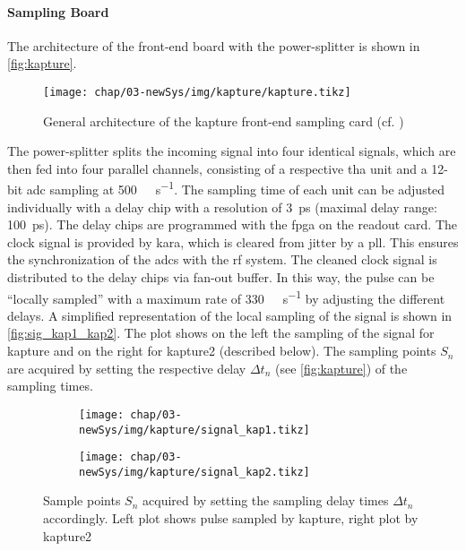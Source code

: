 \paragraph{Sampling Board}
The architecture of the front-end board with the power-splitter is shown in \autoref{fig:kapture}. 
\begin{figure}[H]
	\centering
	\texttt{[image: chap/03-newSys/img/kapture/kapture.tikz]}
	\caption[General architecture of the KAPTURE system]{General architecture of the \Gls{kapture} front-end sampling card (cf. \cite[p.2]{caselleKAP})}
	\label{fig:kapture}
\end{figure}
The power-splitter splits the incoming signal into four identical signals, which are then fed into four parallel channels, consisting of a respective \gls{tha} unit and a 12-bit \gls{adc} sampling at \SI{500}{\mega\sample\per\second}. 
The sampling time of each unit can be adjusted individually with a delay chip with a resolution of \SI{3}{\pico \second} (maximal delay range: \SI{100}{\pico \second}). 
The delay chips are programmed with the \gls{fpga} on the readout card.
The clock signal is provided by \gls{kara}, which is cleared from jitter by a \gls{pll}. 
This ensures the synchronization of the \glspl{adc} with the \gls{rf} system. 
The cleaned clock signal is distributed to the delay chips via fan-out buffer. \cite{caselleKAP}
In this way, the pulse can be ``locally sampled'' with a maximum rate of \SI{330}{\giga\sample\per\second} by adjusting the different delays. \newline
A simplified representation of the local sampling of the signal is shown in \autoref{fig:sig_kap1_kap2}.
The plot shows on the left the sampling of the signal for \gls{kapture} and on the right for \gls{kapture2} (described below).
The sampling points $S_n$ are acquired by setting the respective delay $\Delta t_n$ (see \autoref{fig:kapture}) of the sampling times. 
\begin{figure}[tb]
	\centering
	\begin{subfigure}{0.48\textwidth}
		\centering
		\texttt{[image: chap/03-newSys/img/kapture/signal\_kap1.tikz]}  
		\label{fig:sig_kap1}
	\end{subfigure}
	\hfill
	\begin{subfigure}{0.48\textwidth}
		\centering
		\texttt{[image: chap/03-newSys/img/kapture/signal\_kap2.tikz]}  
		\label{fig:sig_kap2}
	\end{subfigure}
	\caption[KAPTURE Pulse Sampling]{Sample points $S_n$ acquired by setting the sampling delay times $\Delta t_n$ accordingly. Left plot shows pulse sampled by \gls{kapture}, right plot by \gls{kapture2}}
	\label{fig:sig_kap1_kap2}
\end{figure}

